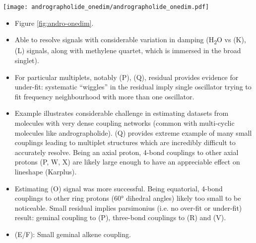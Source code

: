 \begin{sidewaysfigure}
    \centering
    \texttt{[image: andrographolide\_onedim/andrographolide\_onedim.pdf]}
    \caption[
        Result of applying the estimation routine to selected regions of a
        pulse-acquire dataset of andrographolide.
    ]{
        Result of applying the estimation routine to selected regions of a
        pulse-acquire dataset of andrographolide in \acs{DMSOd6}.
        \textbf{a.} Spectral data corresponding to the regions considered.
        \textbf{b.} The result of applying the \acs{MPM} to the regions, with
        the model order predicted with the \acs{MDL}. Blue/red lines: peaks of
        individual oscillators, grey line above: the model (sum of all
        oscillators), grep line below: the residual between the data and the model.
        \textbf{c.} The result after convergence of the \acs{NLP} routine, again
        with the model above and residual below.
        Red peaks in panel b correspond to oscillators which acquire negative
        amplitudes during the \acs{NLP} routine, and are subsequently purged.
        Note that one of the reasons estimated has been split in two in the
        figure to save space, with one half, featuring a signal from ethanol,
        being magnified.
    }
    \label{fig:andro-onedim}
\end{sidewaysfigure}
\begin{itemize}
    \item Figure \ref{fig:andro-onedim}.
    \item Able to resolve signals with considerable variation in damping
        (H\textsubscript{2}O vs (K), (L) signals, along with methylene quartet,
        which is immersed in the broad singlet).
    \item For particular multiplets, notably (P), (Q), residual provides
        evidence for under-fit: systematic ``wiggles'' in the residual imply
        single oscillator trying to fit frequency neighbourhood with more than
        one oscillator.
    \item Example illustrates considerable challenge in estimating datasets
        from molecules with very dense coupling networks (common with
        multi-cyclic molecules like andrographolide). (Q) provides extreme
        example of many small couplings leading to multiplet structures which
        are incredibly difficult to accurately resolve. Being an axial proton,
        4-bond couplings to other axial protons (P, W, X) are likely large
        enough to have an appreciable effect on lineshape (Karplus).
    \item Estimating (O) signal was more successful. Being equatorial, 4-bond
        couplings to other ring protons (\ang{60} dihedral angles) likely too
        small to be noticeable. Small residual implies parsimonius (i.e. no
        over-fit or under-fit) result: geminal coupling to (P), three-bond
        couplings to (R) and (V).
    \item (E/F): Small geminal alkene coupling.
\end{itemize}

